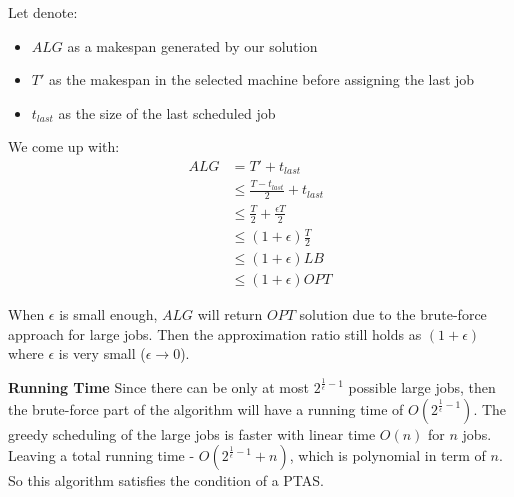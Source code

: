Let denote:
\begin{itemize}
	\item $ ALG $ as a makespan generated by our solution
	\item $ T' $ as the makespan in the selected machine before assigning the last job
	\item $ t_{last} $ as the size of the last scheduled job
\end{itemize}
We come up with:
\begin{align*}
	ALG &= T' + t_{last} \\
 &\le \frac{T - t_{last}}{2} + t_{last} \\
 &\le \frac{T}{2} + \frac{\epsilon T}{2} \\
 &\le (1 + \epsilon)\frac{T}{2} \\
 &\le (1 + \epsilon )LB \\
 &\le (1 + \epsilon)OPT
\end{align*}

When $\epsilon$ is small enough, $ALG$ will return $OPT$ solution due to the brute-force approach for large jobs. Then the approximation ratio still holds as $(1 + \epsilon)$ where $\epsilon$ is very small ($\epsilon \to 0$).

\textbf{Running Time}
Since there can be only at most $ 2^{\frac{1}{\epsilon}-1} $ possible large jobs, then the brute-force part of the algorithm will have a running time of $ O(2^{\frac{1}{\epsilon}-1}) $. The greedy scheduling of the large jobs is faster with linear time $ O(n) $ for $ n $ jobs. Leaving a total running time - $ O(2^{\frac{1}{\epsilon}-1} + n) $, which is polynomial in term of $n$. So this algorithm satisfies the condition of a PTAS.

